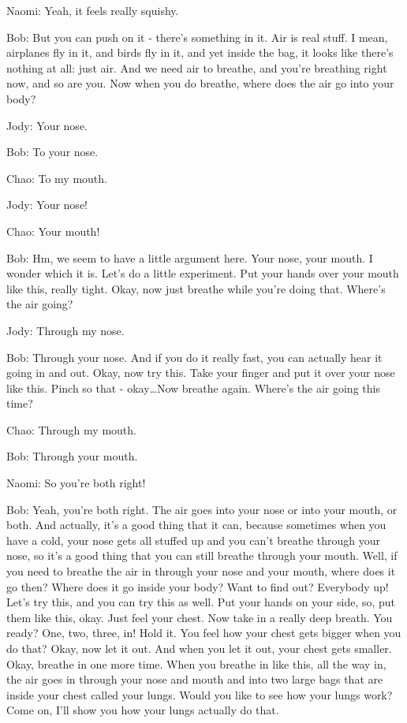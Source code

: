 Naomi: Yeah, it feels really squishy.

Bob: But you can push on it - there's something in it. Air is real stuff. I mean, airplanes fly in it, and birds fly in it, and yet inside the bag, it looks like there's nothing at all: just air. And we need air to breathe, and you're breathing right now, and so are you. Now when you do breathe, where does the air go into your body?

Jody: Your nose.

Bob: To your nose.

Chao: To my mouth.

Jody: Your nose!

Chao: Your mouth!

Bob: Hm, we seem to have a little argument here. Your nose, your mouth. I wonder which it is. Let's do a little experiment. Put your hands over your mouth like this, really tight. Okay, now just breathe while you're doing that. Where's the air going?

Jody: Through my nose.

Bob: Through your nose. And if you do it really fast, you can actually hear it going in and out. Okay, now try this. Take your finger and put it over your nose like this. Pinch so that - okay\dots Now breathe again. Where's the air going this time?

Chao: Through my mouth.

Bob: Through your mouth.

Naomi: So you're both right!

Bob: Yeah, you're both right. The air goes into your nose or into your mouth, or both. And actually, it's a good thing that it can, because sometimes when you have a cold, your nose gets all stuffed up and you can't breathe through your nose, so it's a good thing that you can still breathe through your mouth. Well, if you need to breathe the air in through your nose and your mouth, where does it go then? Where does it go inside your body? Want to find out? Everybody up! Let's try this, and you can try this as well. Put your hands on your side, so, put them like this, okay. Just feel your chest. Now take in a really deep breath. You ready? One, two, three, in! Hold it. You feel how your chest gets bigger when you do that? Okay, now let it out. And when you let it out, your chest gets smaller. Okay, breathe in one more time. When you breathe in like this, all the way in, the air goes in through your nose and mouth and into two large bags that are inside your chest called your lungs. Would you like to see how your lungs work? Come on, I'll show you how your lungs actually do that.

